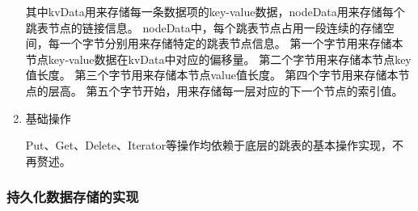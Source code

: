 \begin{enumerate}
			
			其中kvData用来存储每一条数据项的key-value数据，nodeData用来存储每个跳表节点的链接信息。
			nodeData中，每个跳表节点占用一段连续的存储空间，每一个字节分别用来存储特定的跳表节点信息。
			第一个字节用来存储本节点key-value数据在kvData中对应的偏移量。
			第二个字节用来存储本节点key值长度。
			第三个字节用来存储本节点value值长度。
			第四个字节用来存储本节点的层高。
			第五个字节开始，用来存储每一层对应的下一个节点的索引值。

		\item 基础操作
		
		Put、Get、Delete、Iterator等操作均依赖于底层的跳表的基本操作实现，不再赘述。
		\end{enumerate}

		\subsubsection{持久化数据存储的实现}

